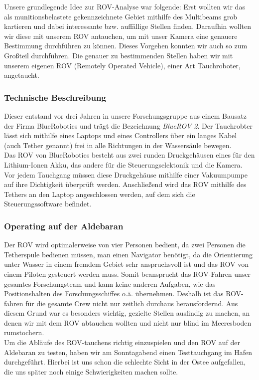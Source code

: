 
Unsere grundlegende Idee zur ROV-Analyse war folgende: Erst wollten wir das als munitionsbelastete gekennzeichnete Gebiet mithilfe 
des Multibeams grob kartieren und dabei 
interessante bzw. auffällige Stellen finden. Daraufhin wollten wir diese mit unserem ROV antauchen, um mit unser Kamera eine genauere Bestimmung durchführen zu können. 
Dieses Vorgehen konnten wir auch so zum Großteil durchführen.
Die genauer zu bestimmenden Stellen haben wir mit unserem eigenen ROV (Remotely Operated Vehicle), einer Art Tauchroboter, angetaucht. 
\subsubsection{Technische Beschreibung}
Dieser entstand vor drei Jahren in unsere Forschungsgruppe aus einem Bausatz der Firma BlueRobotics und trägt die Bezeichnung \emph{BlueROV 2}.
Der Tauchrobter lässt sich mithilfe eines Laptops und eines Controllers über ein langes Kabel (auch Tether genannt) frei in alle Richtungen in der Wassersäule bewegen.\\
Das ROV von BlueRobotics besteht aus zwei runden Druckgehäusen eines für den Lithium-Ionen Akku, das andere für die Steuerungselektonik und die Kamera.
Vor jedem Tauchgang müssen diese Druckgehäuse mithilfe einer Vakuumpumpe auf ihre Dichtigkeit überprüft werden. 
Anschließend wird das ROV mithilfe des Tethers an den Laptop angeschlossen werden, auf dem sich die Steuerungssoftware befindet.
\subsubsection{Operating auf der Aldebaran}
Der ROV wird optimalerweise 
von vier Personen bedient, da zwei Personen die Tetherspule bedienen müssen, man einen Navigator benötigt, da die Orientierung unter Wasser in einem fremdem Gebiet sehr anspruchsvoll ist und das ROV von einem Piloten gesteuert werden muss.
Somit beansprucht das ROV-Fahren unser gesamtes Forschungsteam und kann keine anderen Aufgaben, wie das Positionshalten des Forschungsschiffes o.ä. übernehmen. Deshalb ist das ROV-fahren für die gesamte Crew nicht nur zeitlich durchaus herausfordernd.
Aus diesem Grund war es besonders wichtig, gezielte Stellen ausfindig zu machen, an denen wir mit dem ROV abtauchen wollten und nicht nur blind im Meeresboden rumstochern.
\\

Um die Abläufe des ROV-tauchens richtig einzuspielen und den ROV auf der Aldebaran zu testen, haben wir am Sonntagabend einen Testtauchgang im Hafen durchgeführt. 
Hierbei ist uns schon die schlechte Sicht in der Ostee aufgefallen, die uns später noch einige Schwierigkeiten machen sollte.
\\


